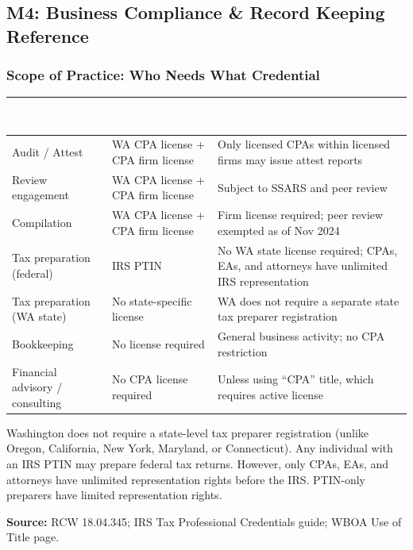 \documentclass[11pt,letterpaper]{article}
\newcommand{\tableheader}[1]{\textbf{\sffamily\textcolor{white}{#1}}}
\begin{document}
\subsection{M4: Business Compliance \& Record Keeping Reference}

\subsubsection{Scope of Practice: Who Needs What Credential}

\begin{center}
\begin{tabularx}{\textwidth}{L{3cm}L{3cm}X}
\toprule
{}
\tableheader{Service} & \tableheader{Credential Required} & \tableheader{Notes} \\
\midrule
Audit / Attest & WA CPA license + CPA firm license & Only licensed CPAs within licensed firms may issue attest reports \\
Review engagement & WA CPA license + CPA firm license & Subject to SSARS and peer review \\
Compilation & WA CPA license + CPA firm license & Firm license required; peer review exempted as of Nov 2024 \\
Tax preparation (federal) & IRS PTIN & No WA state license required; CPAs, EAs, and attorneys have unlimited IRS representation \\
Tax preparation (WA state) & No state-specific license & WA does not require a separate state tax preparer registration \\
Bookkeeping & No license required & General business activity; no CPA restriction \\
Financial advisory / consulting & No CPA license required & Unless using ``CPA'' title, which requires active license \\
\bottomrule
\end{tabularx}
\end{center}

Washington does not require a state-level tax preparer registration (unlike Oregon, California, New York, Maryland, or Connecticut). Any individual with an IRS PTIN may prepare federal tax returns. However, only CPAs, EAs, and attorneys have unlimited representation rights before the IRS. PTIN-only preparers have limited representation rights.

\textbf{Source:} RCW 18.04.345; IRS Tax Professional Credentials guide; WBOA Use of Title page.
\end{document}
